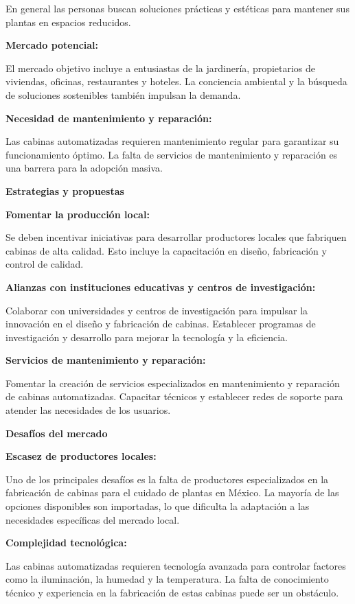 En general las personas buscan soluciones prácticas y estéticas para mantener sus plantas en espacios reducidos.

\textbf{Mercado potencial:}

El mercado objetivo incluye a entusiastas de la jardinería, propietarios de viviendas, oficinas, restaurantes y hoteles.
La conciencia ambiental y la búsqueda de soluciones sostenibles también impulsan la demanda.

\textbf{Necesidad de mantenimiento y reparación:}

Las cabinas automatizadas requieren mantenimiento regular para garantizar su funcionamiento óptimo.
La falta de servicios de mantenimiento y reparación es una barrera para la adopción masiva.

\textbf{Estrategias y propuestas}

\textbf{Fomentar la producción local:}

Se deben incentivar iniciativas para desarrollar productores locales que fabriquen cabinas de alta calidad.
Esto incluye la capacitación en diseño, fabricación y control de calidad.

\textbf{Alianzas con instituciones educativas y centros de investigación:}

Colaborar con universidades y centros de investigación para impulsar la innovación en el diseño y fabricación de cabinas.
Establecer programas de investigación y desarrollo para mejorar la tecnología y la eficiencia.

\textbf{Servicios de mantenimiento y reparación:}

Fomentar la creación de servicios especializados en mantenimiento y reparación de cabinas automatizadas.
Capacitar técnicos y establecer redes de soporte para atender las necesidades de los usuarios.

\textbf{Desafíos del mercado}

\textbf{Escasez de productores locales:}

Uno de los principales desafíos es la falta de productores especializados en la fabricación de cabinas para el cuidado de plantas en México.
La mayoría de las opciones disponibles son importadas, lo que dificulta la adaptación a las necesidades específicas del mercado local.

\textbf{Complejidad tecnológica:}

Las cabinas automatizadas requieren tecnología avanzada para controlar factores como la iluminación, la humedad y la temperatura.
La falta de conocimiento técnico y experiencia en la fabricación de estas cabinas puede ser un obstáculo.

